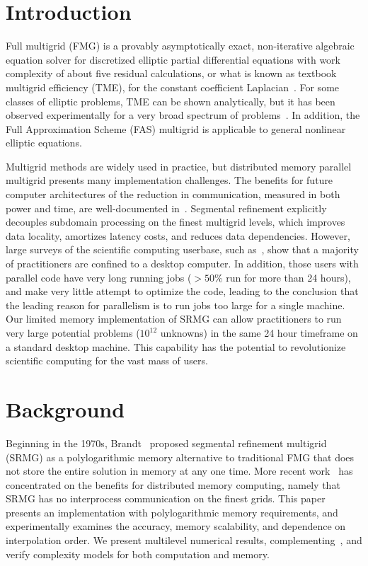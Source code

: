 \section{Introduction}

Full multigrid (FMG) is a provably asymptotically exact, non-iterative algebraic equation solver for discretized
elliptic partial differential equations with work complexity of about five residual calculations, or what is known as
textbook multigrid efficiency (TME), for the constant coefficient Laplacian~\cite{BrandtDiskin1994}. For some classes of
elliptic problems, TME can be shown analytically, but it has been observed experimentally for a very broad spectrum of
problems~\cite{ThomasDiskinBrandt2001,trottenberg2001multigrid,Adams-10a}. In addition, the Full Approximation Scheme
(FAS) multigrid is applicable to general nonlinear elliptic equations.

Multigrid methods are widely used in practice, but distributed memory parallel multigrid presents many implementation
challenges. The benefits for future computer architectures of the reduction in communication, measured in both power and
time, are well-documented in~\cite{AdamsBrownKnepleySamtaney2016}. Segmental refinement explicitly decouples subdomain
processing on the finest multigrid levels, which improves data locality, amortizes latency costs, and reduces data
dependencies. However, large surveys of the scientific computing userbase, such as~\cite{PrabhuEtAl2011}, show that a
majority of practitioners are confined to a desktop computer. In addition, those users with parallel code have very long
running jobs (${} > 50$\% run for more than 24 hours), and make very little attempt to optimize the code, leading to the
conclusion that the leading reason for parallelism is to run jobs too large for a single machine. Our limited memory
implementation of SRMG can allow practitioners to run very large potential problems ($10^{12}$ unknowns) in the same 24
hour timeframe on a standard desktop machine. This capability has the potential to revolutionize scientific computing
for the vast mass of users.

\section{Background}

Beginning in the 1970s, Brandt~\cite{Brandt77,DinarThesis1979,brandt1984} proposed segmental refinement multigrid (SRMG)
as a polylogarithmic memory alternative to traditional FMG that does not store the entire solution in memory at any one
time. More recent work~\cite{BrandtDiskin1994,MohrRude1998,Mohr2000,AdamsBrownKnepleySamtaney2016} has concentrated on
the benefits for distributed memory computing, namely that SRMG has no interprocess communication on the finest
grids. This paper presents an implementation with polylogarithmic memory requirements, and experimentally examines the
accuracy, memory scalability, and dependence on interpolation order. We present multilevel numerical results,
complementing~\cite{AdamsBrownKnepleySamtaney2016}, and verify complexity models for both computation and memory.

